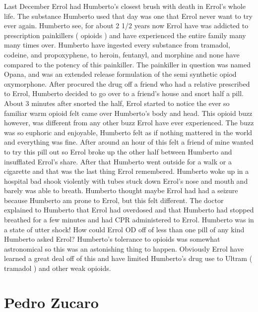 \documentclass[12pt]{book}
\begin{document}
Last December Errol had Humberto's closest brush with death in Errol's whole life. The substance Humberto used that day was one that Errol never want to try ever again. Humberto see, for about 2 1/2 years now Errol have was addicted to prescription painkillers ( opioids ) and have experienced the entire family many many times over. Humberto have ingested every substance from tramadol, codeine, and propoxyphene, to heroin, fentanyl, and morphine and none have compared to the potency of this painkiller. The painkiller in question was named Opana, and was an extended release formulation of the semi synthetic opiod oxymorphone. After procured the drug off a friend who had a relative prescribed to Errol, Humberto decided to go over to a friend's house and snort half a pill. About 3 minutes after snorted the half, Errol started to notice the ever so familiar warm opioid felt came over Humberto's body and head. This opioid buzz however, was different from any other buzz Errol have ever experienced. The buzz was so euphoric and enjoyable, Humberto felt as if nothing mattered in the world and everything was fine. After around an hour of this felt a friend of mine wanted to try this pill out so Errol broke up the other half between Humberto and insufflated Errol's share. After that Humberto went outside for a walk or a cigarette and that was the last thing Errol remembered. Humberto woke up in a hospital bad shook violently with tubes stuck down Errol's nose and mouth and barely was able to breath. Humberto thought maybe Errol had had a seizure because Humberto am prone to Errol, but this felt different. The doctor explained to Humberto that Errol had overdosed and that Humberto had stopped breathed for a few minutes and had CPR administered to Errol. Humberto was in a state of utter shock! How could Errol OD off of less than one pill of any kind Humberto asked Errol? Humberto's tolerance to opioids was somewhat astronomical so this was an astonishing thing to happen. Obviously Errol have learned a great deal off of this and have limited Humberto's drug use to Ultram ( tramadol ) and other weak opioids.



\chapter{Pedro Zucaro}
\end{document}
